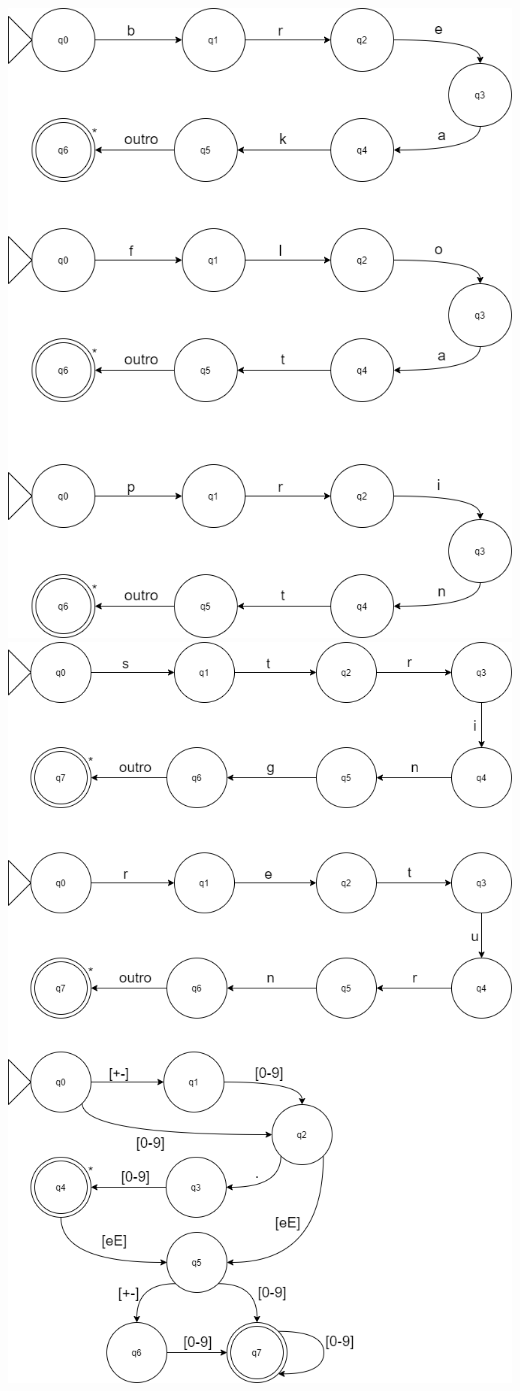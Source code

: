 \documentclass[
	12pt,				%
	openright,			%
	twoside,			%
	a4paper,			%
	english,			%
	french,				%
	spanish,			%
	brazil				%
	]{abntex2}
\begin{document}
\includegraphics[scale=0.7]{8.png}
\\
\includegraphics[scale=0.7]{9.png}
\end{document}
